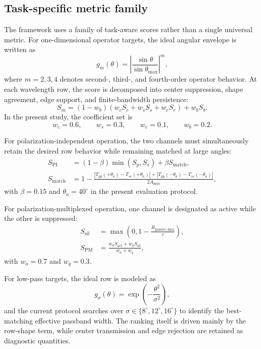 \documentclass[10pt,a4paper]{article}
\begin{document}
\subsection{Task-specific metric family}

The framework uses a family of task-aware scores rather than a single universal metric. For one-dimensional operator targets, the ideal angular envelope is written as
\begin{equation}
g_m(\theta)=\left|\frac{\sin\theta}{\sin\theta_{\max}}\right|^m,
\end{equation}
where $m=2,3,4$ denotes second-, third-, and fourth-order operator behavior. At each wavelength row, the score is decomposed into center suppression, shape agreement, edge support, and finite-bandwidth persistence:
\begin{equation}
S_m=(1-w_b)\left(w_cS_c+w_sS_s+w_eS_e\right)+w_bS_b.
\end{equation}
In the present study, the coefficient set is
\begin{equation}
w_c=0.6,\qquad w_s=0.3,\qquad w_e=0.1,\qquad w_b=0.2.
\end{equation}

For polarization-independent operation, the two channels must simultaneously retain the desired row behavior while remaining matched at large angles:
\begin{align}
S_{\mathrm{PI}}&=(1-\beta)\min(S_p,S_s)+\beta S_{\mathrm{match}},\\
S_{\mathrm{match}}&=1-\frac{|T_{pp}(+\theta_a)-T_{ss}(+\theta_a)|+|T_{pp}(-\theta_a)-T_{ss}(-\theta_a)|}{2A_{\max}},
\end{align}
with $\beta=0.15$ and $\theta_a=40^\circ$ in the present evaluation protocol.

For polarization-multiplexed operation, one channel is designated as active while the other is suppressed:
\begin{align}
S_{\mathrm{sil}}&=\max\left(0,1-\frac{R_{\mathrm{passive,max}}}{\tau}\right),\\
S_{\mathrm{PM}}&=\frac{w_aS_{\mathrm{act}}+w_qS_{\mathrm{sil}}}{w_a+w_q},
\end{align}
with $w_a=0.7$ and $w_q=0.3$.

For low-pass targets, the ideal row is modeled as
\begin{equation}
g_\sigma(\theta)=\exp\!\left(-\frac{\theta^2}{\sigma^2}\right),
\end{equation}
and the current protocol searches over $\sigma\in\{8^\circ,12^\circ,16^\circ\}$ to identify the best-matching effective passband width. The ranking itself is driven mainly by the row-shape term, while center transmission and edge rejection are retained as diagnostic quantities.
\end{document}
